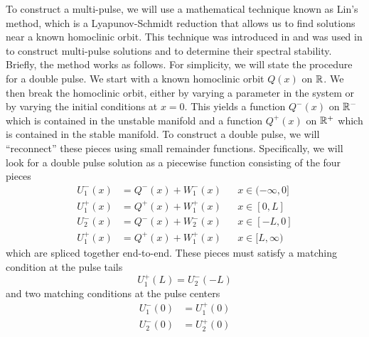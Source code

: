 \documentclass[thesis.tex]{subfiles}
\begin{document}
To construct a multi-pulse, we will use a mathematical technique known as Lin's method, which is a Lyapunov-Schmidt reduction that allows us to find solutions near a known homoclinic orbit. This technique was introduced in \cite{Lin1990} and was used in \cite{Sandstede1993,SandstedeStrut} to construct multi-pulse solutions and \cite{Sandstede1998} to determine their spectral stability. Briefly, the method works as follows. For simplicity, we will state the procedure for a double pulse. We start with a known homoclinic orbit $Q(x)$ on $\mathbb{R}$. We then break the homoclinic orbit, either by varying a parameter in the system or by varying the initial conditions at $x = 0$. This yields a function $Q^-(x)$ on $\mathbb{R}^-$ which is contained in the unstable manifold and a function $Q^+(x)$ on $\mathbb{R}^+$ which is contained in the stable manifold. To construct a double pulse, we will ``reconnect'' these pieces using small remainder functions. Specifically, we will look for a double pulse solution as a piecewise function consisting of the four pieces
\begin{align*}
U_1^-(x) &= Q^-(x) + W_1^-(x) && x \in (-\infty, 0] \\
U_1^+(x) &= Q^+(x) + W_1^+(x) && x \in [0, L] \\
U_2^-(x) &= Q^-(x) + W_2^-(x) && x \in [-L, 0] \\
U_1^+(x) &= Q^+(x) + W_1^+(x) && x \in [L, \infty)
\end{align*}
which are spliced together end-to-end. These pieces must satisfy a matching condition at the pulse tails
\begin{equation}\label{introLin1}
U_1^+(L) = U_2^-(-L)
\end{equation} 
and two matching conditions at the pulse centers
\begin{equation}\label{introLin2}
\begin{aligned}
U_1^-(0) &= U_1^+(0) \\
U_2^-(0) &= U_2^+(0)
\end{aligned}
\end{equation} 
\end{document}
